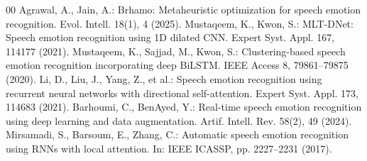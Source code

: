 \documentclass[twocolumn]{article}
\begin{document}
\begin{thebibliography}{00}
 Agrawal, A., Jain, A.: Brhamo: Metaheuristic optimization for speech emotion recognition. Evol. Intell. 18(1), 4 (2025).
 Mustaqeem, K., Kwon, S.: MLT-DNet: Speech emotion recognition using 1D dilated CNN. Expert Syst. Appl. 167, 114177 (2021).
 Mustaqeem, K., Sajjad, M., Kwon, S.: Clustering-based speech emotion recognition incorporating deep BiLSTM. IEEE Access 8, 79861--79875 (2020).
 Li, D., Liu, J., Yang, Z., et al.: Speech emotion recognition using recurrent neural networks with directional self-attention. Expert Syst. Appl. 173, 114683 (2021).
 Barhoumi, C., BenAyed, Y.: Real-time speech emotion recognition using deep learning and data augmentation. Artif. Intell. Rev. 58(2), 49 (2024).
 Mirsamadi, S., Barsoum, E., Zhang, C.: Automatic speech emotion recognition using RNNs with local attention. In: IEEE ICASSP, pp. 2227--2231 (2017).
\end{thebibliography}
\end{document}
